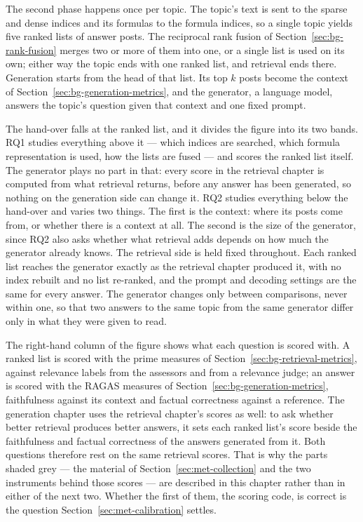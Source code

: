 The second phase happens once per topic. The topic's text is sent to the sparse and
dense indices and its formulas to the formula indices, so a single topic yields five
ranked lists of answer posts. The reciprocal rank fusion of
Section~\ref{sec:bg-rank-fusion} merges two or more of them into one, or a single list
is used on its own; either way the topic ends with one ranked list, and retrieval ends
there. Generation starts from the head of that list. Its top $k$ posts become the
context of Section~\ref{sec:bg-generation-metrics}, and the generator, a language model,
answers the topic's question given that context and one fixed prompt.

The hand-over falls at the ranked list, and it divides the figure into its two bands.
RQ1 studies everything above it --- which indices are searched, which formula
representation is used, how the lists are fused --- and scores the ranked list itself.
The generator plays no part in that: every score in the retrieval chapter is
computed from what retrieval returns, before any answer has been generated, so nothing
on the generation side can change it.
RQ2 studies everything below the hand-over and varies two things. The first is the
context: where its posts come from, or whether there is a context at all. The second is
the size of the generator, since RQ2 also asks whether what retrieval adds depends on
how much the generator already knows. The retrieval side is held fixed throughout. Each
ranked list reaches the generator exactly as the retrieval chapter produced it,
with no index rebuilt and no list re-ranked, and the prompt and decoding settings are the
same for every answer. The generator changes only between comparisons, never within one,
so that two answers to the same topic from the same generator differ only in what they
were given to read.

The right-hand column of the figure shows what each question is scored with. A ranked
list is scored with the prime measures of Section~\ref{sec:bg-retrieval-metrics},
against relevance labels from the assessors and from a relevance judge; an answer is
scored with the RAGAS measures of Section~\ref{sec:bg-generation-metrics}, faithfulness
against its context and factual correctness against a reference.
The generation chapter uses the retrieval chapter's scores as
well: to ask whether better retrieval produces better answers, it sets each ranked list's
score beside the faithfulness and factual correctness of the answers generated from it.
Both questions therefore rest on the same retrieval scores.
That is why the parts shaded grey --- the
material of Section~\ref{sec:met-collection} and the two instruments behind those scores
--- are described in this chapter rather than in either of the next two. Whether the
first of them, the scoring code, is correct is the question
Section~\ref{sec:met-calibration} settles.

